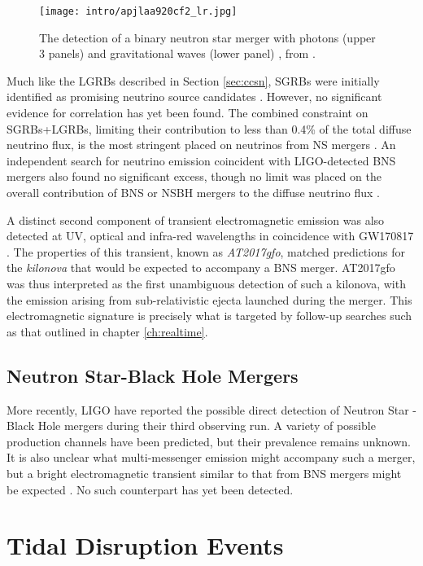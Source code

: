 \begin{figure}[!ht]
	\centering \texttt{[image: intro/apjlaa920cf2\_lr.jpg]}
	\caption{The detection of a binary neutron star merger with photons (upper 3 panels) and gravitational waves (lower panel) , from \cite{grb170817}.}
	\label{fig:gw170817}
\end{figure}

Much like the LGRBs described in Section \ref{sec:ccsn}, SGRBs were initially identified as promising neutrino source candidates \cite{waxman_bahcall_97_grb}. However, no significant evidence for correlation has yet been found. The combined constraint on SGRBs+LGRBs, limiting their contribution to less than 0.4\% of the total diffuse neutrino flux, is the most stringent placed on neutrinos from NS mergers \cite{ic_grb_17}. An independent search for neutrino emission coincident with LIGO-detected BNS mergers also found no significant excess, though no limit was placed on the overall contribution of BNS or NSBH mergers to the diffuse neutrino flux .

A distinct second component of transient electromagnetic emission was also detected at UV, optical and infra-red wavelengths in coincidence with GW170817 \cite{gw170817_mm}. The properties of this transient, known as \emph{AT2017gfo}, matched predictions for the \emph{kilonova} that would be expected to accompany a BNS merger. AT2017gfo was thus interpreted as the first unambiguous detection of such a kilonova, with the emission arising from sub-relativistic ejecta launched during the merger. This electromagnetic signature is precisely what is targeted by follow-up searches such as that outlined in chapter \ref{ch:realtime}.

\subsection*{Neutron Star-Black Hole Mergers}

More recently, LIGO have reported the possible direct detection of Neutron Star - Black Hole mergers during their third observing run. A variety of possible production channels have been predicted, but their prevalence remains unknown. It is also unclear what multi-messenger emission might accompany such a merger, but a bright electromagnetic transient similar to that from BNS mergers might be expected . No such counterpart has yet been detected.


\section{Tidal Disruption Events}
\label{sec:tde}

